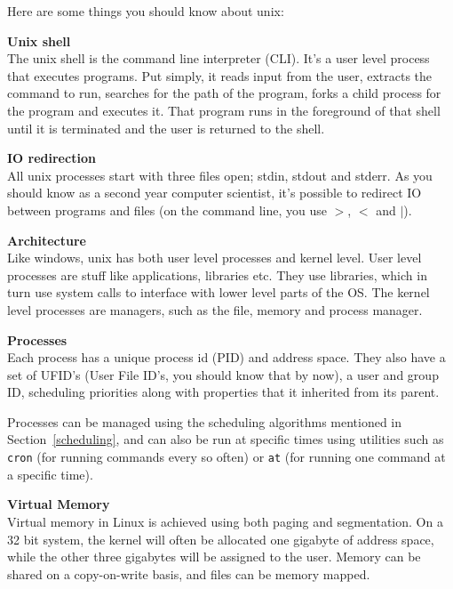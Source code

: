 Here are some things you should know about unix:

\begin{description}
  \item \textbf{Unix shell}\\
  The unix shell is the command line interpreter (CLI). It's a user level
  process that executes programs. Put simply, it reads input from the user,
  extracts the command to run, searches for the path of the program, forks a
  child process for the program and executes it. That program runs in the
  foreground of that shell until it is terminated and the user is returned to the
  shell.

  \item \textbf{IO redirection}\\
  All unix processes start with three files open; stdin, stdout and stderr. As
  you should know as a second year computer scientist, it's possible to redirect
  IO between programs and files (on the command line, you use $>$, $<$ and $|$).

  \item \textbf{Architecture}\\
  Like windows, unix has both user level processes and kernel level. User level
  processes are stuff like applications, libraries etc. They use libraries,
  which in turn use system calls to interface with lower level parts of the OS.
  The kernel level processes are managers, such as the file, memory and process
  manager.

  \item \textbf{Processes}\\
  Each process has a unique process id (PID) and address space. They also have a
  set of UFID's (User File ID's, you should know that by now), a user and group
  ID, scheduling priorities along with properties that it inherited from its
  parent.

  Processes can be managed using the scheduling algorithms mentioned in
  Section~\ref{scheduling}, and can also be run at specific times using
  utilities such as \texttt{cron} (for running commands every so often) or
  \texttt{at} (for running one command at a specific time).

  \item \textbf{Virtual Memory}\\
  Virtual memory in Linux is achieved using both paging and segmentation. On a
  32 bit system, the kernel will often be allocated one gigabyte of address
  space, while the other three gigabytes will be assigned to the user. Memory
  can be shared on a copy-on-write basis, and files can be memory mapped.


\end{description}
